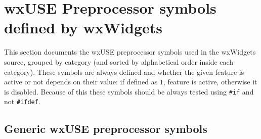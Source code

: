 
\section{wxUSE Preprocessor symbols defined by wxWidgets}\label{wxusedef}

This section documents the wxUSE preprocessor symbols used in the wxWidgets
source, grouped by category (and sorted by alphabetical order inside each
category). These symbols are always defined and whether the given feature is
active or not depends on their value: if defined as $1$, feature is active,
otherwise it is disabled. Because of this these symbols should be always tested
using \texttt{#if} and not \texttt{#ifdef}.

\subsection{Generic wxUSE preprocessor symbols}\label{\helpref{wxusedefmulti}{wxusedefmulti}}

